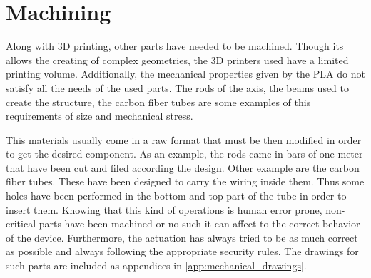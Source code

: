 \section{Machining} %
\label{sec:machining}
Along with 3D printing, other parts have needed to be machined.
Though its allows the creating of complex geometries, the 3D printers used have a limited printing volume.
Additionally, the mechanical properties given by the PLA do not satisfy all the needs of the used parts.
The rods of the axis, the beams used to create the structure, the carbon fiber tubes are some examples of this requirements of size and mechanical stress.


This materials usually come in a raw format that must be then modified in order to get the desired component.
As an example, the rods came in bars of one meter that have been cut and filed according the design.
Other example are the carbon fiber tubes.
These have been designed to carry the wiring inside them.
Thus some holes have been performed in the bottom and top part of the tube in order to insert them.
Knowing that this kind of operations is human error prone, non-critical parts have been machined or no such it can affect to the correct behavior of the device.
Furthermore, the actuation has always tried to be as much correct as possible and always following the appropriate security rules.
The drawings for such parts are included as appendices in \ref{app:mechanical_drawings}.
